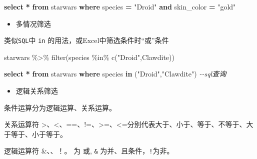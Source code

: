 \documentclass[
]{book}
\newenvironment{Shaded}{\begin{snugshade}}{\end{snugshade}}
\newcommand{\CommentTok}[1]{\textcolor[rgb]{0.56,0.35,0.01}{\textit{#1}}}
\newcommand{\FunctionTok}[1]{\textcolor[rgb]{0.00,0.00,0.00}{#1}}
\newcommand{\KeywordTok}[1]{\textcolor[rgb]{0.13,0.29,0.53}{\textbf{#1}}}
\newcommand{\NormalTok}[1]{#1}
\newcommand{\OperatorTok}[1]{\textcolor[rgb]{0.81,0.36,0.00}{\textbf{#1}}}
\newcommand{\OtherTok}[1]{\textcolor[rgb]{0.56,0.35,0.01}{#1}}
\newcommand{\SpecialCharTok}[1]{\textcolor[rgb]{0.00,0.00,0.00}{#1}}
\newcommand{\StringTok}[1]{\textcolor[rgb]{0.31,0.60,0.02}{#1}}
\providecommand{\tightlist}{%
  \setlength{\itemsep}{0pt}\setlength{\parskip}{0pt}}
\begin{document}
\begin{Shaded}
\begin{Highlighting}[]
\KeywordTok{select} \OperatorTok{*} \KeywordTok{from}\NormalTok{ starwars }\KeywordTok{where}\NormalTok{ species }\OperatorTok{=} \OtherTok{"Droid"} \KeywordTok{and}\NormalTok{ skin\_color }\OperatorTok{=} \OtherTok{"gold"} 
\end{Highlighting}
\end{Shaded}

\begin{itemize}
\tightlist
\item
  多情况筛选
\end{itemize}

类似\texttt{SQL}中 \texttt{in} 的用法，或Excel中筛选条件时``或''条件

\begin{Shaded}
\begin{Highlighting}[]
\NormalTok{starwars }\SpecialCharTok{\%\textgreater{}\%} 
  \FunctionTok{filter}\NormalTok{(species }\SpecialCharTok{\%in\%}  \FunctionTok{c}\NormalTok{(}\StringTok{"Droid"}\NormalTok{,}\StringTok{\textquotesingle{}Clawdite\textquotesingle{}}\NormalTok{))}
\end{Highlighting}
\end{Shaded}

\begin{Shaded}
\begin{Highlighting}[]
\KeywordTok{select} \OperatorTok{*} \KeywordTok{from}\NormalTok{ starwars }\KeywordTok{where}\NormalTok{ species }\KeywordTok{in}\NormalTok{ (}\OtherTok{"Droid"}\NormalTok{,}\OtherTok{"Clawdite"}\NormalTok{) }\CommentTok{{-}{-}sql查询}
\end{Highlighting}
\end{Shaded}

\begin{itemize}
\tightlist
\item
  逻辑关系筛选
\end{itemize}

条件运算分为逻辑运算、关系运算。

关系运算符 \textgreater、\textless、==、!=、\textgreater=、\textless=分别代表大于、小于、等于、不等于、大于等于、小于等于。

逻辑运算符 \&、\textbar、！。 \texttt{\textbar{}}为 或, \texttt{\&} 为并、且条件，\texttt{!}为非。
\end{document}
